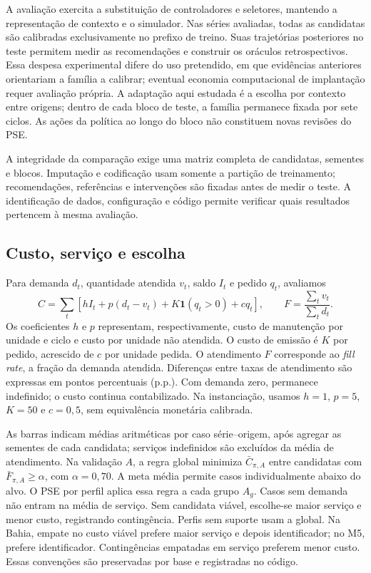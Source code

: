 \documentclass[preprint,12pt]{elsarticle}
\begin{document}
A avaliação exercita a substituição de controladores e seletores, mantendo a representação de contexto e o simulador. Nas séries avaliadas, todas as candidatas são calibradas exclusivamente no prefixo de treino. Suas trajetórias posteriores no teste permitem medir as recomendações e construir os oráculos retrospectivos. Essa despesa experimental difere do uso pretendido, em que evidências anteriores orientariam a família a calibrar; eventual economia computacional de implantação requer avaliação própria. A adaptação aqui estudada é a escolha por contexto entre origens; dentro de cada bloco de teste, a família permanece fixada por sete ciclos. As ações da política ao longo do bloco não constituem novas revisões do PSE.

A integridade da comparação exige uma matriz completa de candidatas, sementes e blocos. Imputação e codificação usam somente a partição de treinamento; recomendações, referências e intervenções são fixadas antes de medir o teste. A identificação de dados, configuração e código permite verificar quais resultados pertencem à mesma avaliação.

\subsection{Custo, serviço e escolha}
Para demanda $d_t$, quantidade atendida $v_t$, saldo $I_t$ e pedido $q_t$, avaliamos
\begin{equation}
 C=\sum_t[hI_t+p(d_t-v_t)+K\mathbf1(q_t>0)+cq_t],
 \qquad F=\frac{\sum_t v_t}{\sum_t d_t}.
 \label{eq:metrics}
\end{equation}
Os coeficientes $h$ e $p$ representam, respectivamente, custo de manutenção por unidade e ciclo e custo por unidade não atendida. O custo de emissão é $K$ por pedido, acrescido de $c$ por unidade pedida. O atendimento $F$ corresponde ao \textit{fill rate}, a fração da demanda atendida. Diferenças entre taxas de atendimento são expressas em pontos percentuais (p.p.). Com demanda zero, permanece indefinido; o custo continua contabilizado. Na instanciação, usamos $h=1$, $p=5$, $K=50$ e $c=0{,}5$, sem equivalência monetária calibrada.

As barras indicam médias aritméticas por caso série--origem, após agregar as sementes de cada candidata; serviços indefinidos são excluídos da média de atendimento. Na validação $A$, a regra global minimiza $\bar C_{\pi,A}$ entre candidatas com $\bar F_{\pi,A}\geq\alpha$, com $\alpha=0{,}70$. A meta média permite casos individualmente abaixo do alvo. O PSE por perfil aplica essa regra a cada grupo $A_g$. Casos sem demanda não entram na média de serviço. Sem candidata viável, escolhe-se maior serviço e menor custo, registrando contingência. Perfis sem suporte usam a global. Na Bahia, empate no custo viável prefere maior serviço e depois identificador; no M5, prefere identificador. Contingências empatadas em serviço preferem menor custo. Essas convenções são preservadas por base e registradas no código.
\end{document}
